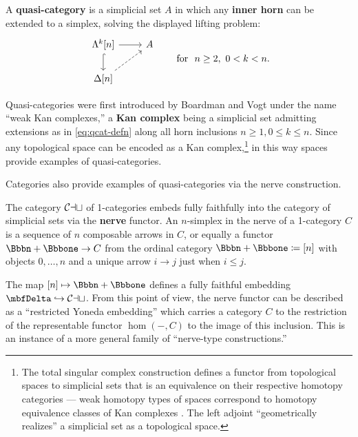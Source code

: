 \begin{defn}\label{defn:quasi-category} A \textbf{quasi-category} is a simplicial set $A$ in which any \textbf{inner horn} can be extended to a simplex, solving the displayed lifting problem:
  \begin{equation}\label{eq:qcat-defn}
  \begin{tikzcd}
  \Lambda^k[n] \arrow[r] \arrow[d, hook] & A  \\ \Delta[n] \arrow[ur, dashed]
  \end{tikzcd} \qquad  \text{for}\ \ n \geq 2,\ 0 < k < n.
  \end{equation}
  \end{defn}

  Quasi-categories were first introduced by Boardman and Vogt \cite{BoardmanVogt:1973hi} under the name ``weak Kan complexes,'' a \textbf{Kan complex} being a simplicial set admitting extensions as in \eqref{eq:qcat-defn} along all horn inclusions $n \geq 1, 0 \leq k \leq n$. Since any topological space can be encoded as a Kan complex,\footnote{The total singular complex construction defines a functor from topological spaces to simplicial sets that is an equivalence on their respective homotopy categories --- weak homotopy types of spaces correspond to homotopy equivalence classes of Kan complexes \cite[\S II.2]{Quillen:1967ha}. The left adjoint %
    ``geometrically realizes'' a simplicial set as a topological space.}
 in this way spaces provide examples of quasi-categories.

 Categories also provide examples of quasi-categories via the nerve construction.

 \begin{defn}[nerve]\label{defn:nerve} The category ${\mathord{\mathcal{Cat}}}$ of 1-categories embeds fully faithfully into the category of simplicial sets via the \textbf{nerve} functor. An $n$-simplex in the nerve of a 1-category $C$ is a sequence of $n$ composable arrows in $C$, or equally a functor $\Bbbn +\catone \to C$ from the ordinal category $\Bbbn +\catone \coloneq [n]$ with objects $0,\ldots, n$ and a unique arrow $i \to j$ just when $i \leq j$.
 \end{defn}

 The map $[n] \mapsto \Bbbn +\catone$ defines a fully faithful embedding $\Del\inc\Cat$. From this point of view, the nerve functor can be described as a ``restricted Yoneda embedding'' which carries a category $C$ to the restriction of the representable functor $\hom(-,C)$ to the image of this inclusion. This is an instance of a more general family of ``nerve-type constructions.'' %


